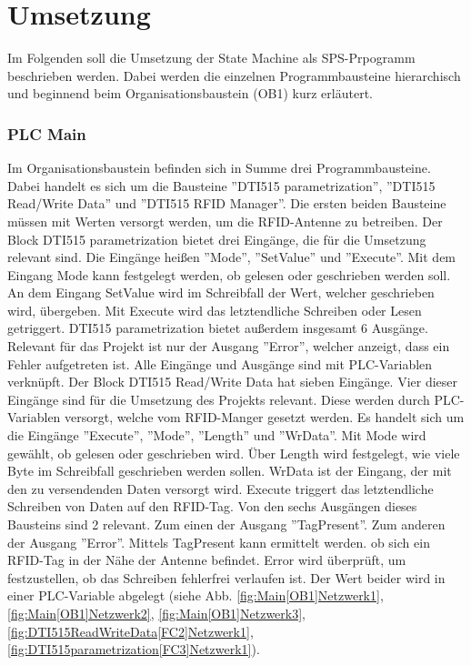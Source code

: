 \chapter*{Umsetzung}
\label{cha:Umsetzung}
Im Folgenden soll die Umsetzung der State Machine als SPS-Prpogramm beschrieben werden. Dabei werden die einzelnen Programmbausteine hierarchisch und beginnend beim Organisationsbaustein (OB1) kurz erläutert.

\subsection*{PLC Main}
\label{subsec:PLC_Main}
Im Organisationsbaustein befinden sich in Summe drei Programmbausteine. Dabei handelt es sich um die Bausteine ''DTI515 parametrization'', ''DTI515 Read/Write Data'' und ''DTI515 RFID Manager''. Die ersten beiden Bausteine müssen mit Werten versorgt werden, um die RFID-Antenne zu betreiben.
Der Block DTI515 parametrization bietet drei Eingänge, die für die Umsetzung relevant sind. Die Eingänge heißen ''Mode'', ''SetValue'' und ''Execute''. Mit dem Eingang Mode kann festgelegt werden, ob gelesen oder geschrieben werden soll. An dem Eingang SetValue wird im Schreibfall der Wert, welcher geschrieben wird, übergeben. Mit Execute wird das letztendliche Schreiben oder Lesen getriggert. DTI515 parametrization bietet außerdem insgesamt 6 Ausgänge. Relevant für das Projekt ist nur der Ausgang ''Error'', welcher anzeigt, dass ein Fehler aufgetreten ist. Alle Eingänge und Ausgänge sind mit PLC-Variablen verknüpft.
Der Block DTI515 Read/Write Data hat sieben Eingänge. Vier dieser Eingänge sind für die Umsetzung des Projekts relevant. Diese werden durch PLC-Variablen versorgt, welche vom RFID-Manger gesetzt werden. Es handelt sich um die Eingänge ''Execute'', ''Mode'', ''Length'' und ''WrData''. Mit Mode wird gewählt, ob gelesen oder geschrieben wird. Über Length wird festgelegt, wie viele Byte im Schreibfall geschrieben werden sollen. WrData ist der Eingang, der mit den zu versendenden Daten versorgt wird. Execute triggert das letztendliche Schreiben von Daten auf den RFID-Tag. Von den sechs Ausgängen dieses Bausteins sind 2 relevant. Zum einen der Ausgang ''TagPresent''. Zum anderen der Ausgang ''Error''. Mittels TagPresent kann ermittelt werden. ob sich ein RFID-Tag in der Nähe der Antenne befindet. Error wird überprüft, um festzustellen, ob das Schreiben fehlerfrei verlaufen ist. Der Wert beider wird in einer PLC-Variable abgelegt (siehe Abb. \ref{fig:Main[OB1]Netzwerk1}, \ref{fig:Main[OB1]Netzwerk2}, \ref{fig:Main[OB1]Netzwerk3}, \ref{fig:DTI515ReadWriteData[FC2]Netzwerk1}, \ref{fig:DTI515parametrization[FC3]Netzwerk1}).

